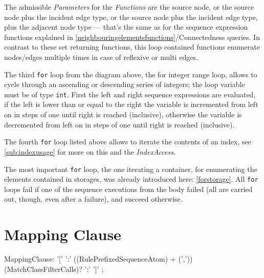 The admissible \emph{Parameters} for the \emph{Functions} are the source node, or the source node plus the incident edge type, or the source node plus the incident edge type, plus the adjacent node type ---
that's the same as for the sequence expression functions explained in \ref{neighbouringelementsfunctions}/Connectedness queries.
In contrast to these set returning functions, this loop contained functions enumerate nodes/edges multiple times in case of reflexive or multi edges.

The third \texttt{for} loop from the diagram above, the for integer range loop, allows to cycle through an ascending or descending series of integers; the loop variable must be of type \texttt{int}.
First the left and right sequence expressions are evaluated,
if the left is lower than or equal to the right the variable is incremented from left on in steps of one until right is reached (inclusive),
otherwise the variable is decremented from left on in steps of one until right is reached (inclusive).

The fourth \texttt{for} loop listed above allows to iterate the contents of an index, see \ref{sub:indexusage} for more on this and the \emph{IndexAccess}.

The most important \texttt{for} loop, the one iterating a container, for enumerating the elements contained in storages, was already introduced here: \ref{forstorage}.
All \texttt{for} loops fail if one of the sequence executions from the body failed (all are carried out, though, even after a failure), and succeed otherwise.


\section{Mapping Clause} \label{sec:mappingclause}


\begin{rail}
  MappingClause: '[' ':' ((RulePrefixedSequenceAtom) + (',')) (MatchClassFilterCalls)? ':' ']' ;
\end{rail}

